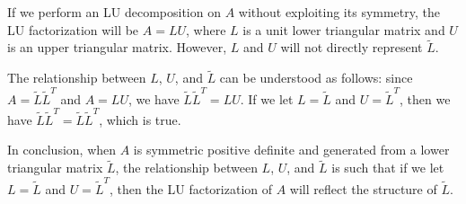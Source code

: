 \documentclass{article}
\begin{document}
If we perform an LU decomposition on \( A \) without exploiting its symmetry, the LU factorization will be \( A = LU \), where \( L \) is a unit lower triangular matrix and \( U \) is an upper triangular matrix. However, \( L \) and \( U \) will not directly represent \( \tilde{L} \).

The relationship between \( L \), \( U \), and \( \tilde{L} \) can be understood as follows: since \( A = \tilde{L} \tilde{L}^T \) and \( A = LU \), we have \( \tilde{L} \tilde{L}^T = LU \). If we let \( L = \tilde{L} \) and \( U = \tilde{L}^T \), then we have \( \tilde{L} \tilde{L}^T = \tilde{L} \tilde{L}^T \), which is true. 

In conclusion, when \( A \) is symmetric positive definite and generated from a lower triangular matrix \( \tilde{L} \), the relationship between \( L \), \( U \), and \( \tilde{L} \) is such that if we let \( L = \tilde{L} \) and \( U = \tilde{L}^T \), then the LU factorization of \( A \) will reflect the structure of \( \tilde{L} \).
\end{document}
